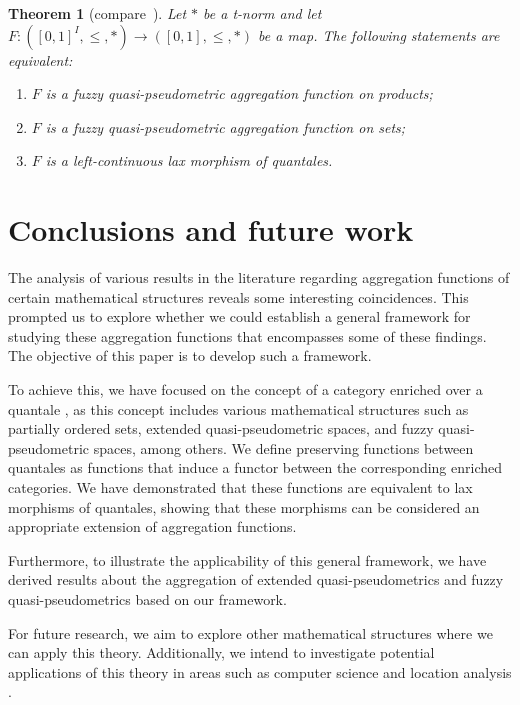 \documentclass[11pt,a4paper]{amsart}
\newtheorem{theorem}{Theorem}[section]
\theoremstyle{definition}
\begin{document}
	\begin{theorem}[\mbox{compare \cite[Theorem 4.21]{PRLVale21}}]
		Let $\ast$ be a t-norm and let $F:([0,1]^I,\leq,\ast)\to([0,1],\leq,\ast)$ be a map. The following statements are equivalent:
		\begin{enumerate}[(1)]
			\item $F$ is a fuzzy quasi-pseudometric aggregation function on products;
			\item $F$ is a fuzzy quasi-pseudometric aggregation function on sets;
			\item $F$ is a left-continuous lax morphism of quantales.
		\end{enumerate}
	\end{theorem}
	
\section{Conclusions and future work}

The analysis of various results in the literature regarding aggregation functions of certain mathematical structures \cite{Corazza99,Dobos98,MayorVale10,MayorVale19,MartinMayorVale11,MassaVale13,MinyaVale19,PRLVale21} reveals some interesting coincidences. This prompted us to explore whether we could establish a general framework for studying these aggregation functions that encompasses some of these findings. The objective of this paper is to develop such a framework.

To achieve this, we have focused on the concept of a category enriched over a quantale \cite{BookMonoidalTopology}, as this concept includes various mathematical structures such as partially ordered sets, extended quasi-pseudometric spaces, and fuzzy quasi-pseudometric spaces, among others. We define preser\-ving functions between quantales as functions that induce a functor between the corresponding enriched categories. We have demonstrated that these functions are equivalent to lax morphisms of quantales, showing that these morphisms can be considered an appropriate extension of aggregation functions.

Furthermore, to illustrate the applicability of this general framework, we have derived results about the aggregation of extended quasi-pseudometrics and fuzzy quasi-pseudometrics based on our framework.

For future research, we aim to explore other mathematical structures where we can apply this theory. Additionally, we intend to investigate potential applications of this theory in areas such as computer science \cite{MayorVale10} and location analysis \cite{MinyaVale19}.
\end{document}
